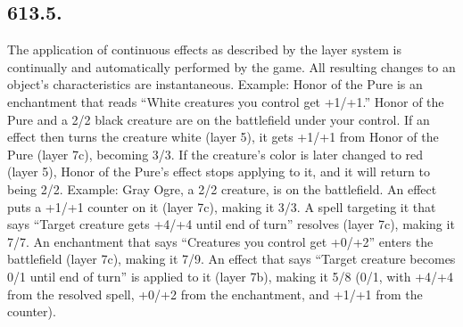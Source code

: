 \subsection*{613.5.}
The application of continuous effects as described by the layer system is continually and automatically performed by the game. All resulting changes to an object’s characteristics are instantaneous.
Example: Honor of the Pure is an enchantment that reads “White creatures you control get +1/+1.” Honor of the Pure and a 2/2 black creature are on the battlefield under your control. If an effect then turns the creature white (layer 5), it gets +1/+1 from Honor of the Pure (layer 7c), becoming 3/3. If the creature’s color is later changed to red (layer 5), Honor of the Pure’s effect stops applying to it, and it will return to being 2/2.
Example: Gray Ogre, a 2/2 creature, is on the battlefield. An effect puts a +1/+1 counter on it (layer 7c), making it 3/3. A spell targeting it that says “Target creature gets +4/+4 until end of turn” resolves (layer 7c), making it 7/7. An enchantment that says “Creatures you control get +0/+2” enters the battlefield (layer 7c), making it 7/9. An effect that says “Target creature becomes 0/1 until end of turn” is applied to it (layer 7b), making it 5/8 (0/1, with +4/+4 from the resolved spell, +0/+2 from the enchantment, and +1/+1 from the counter).


